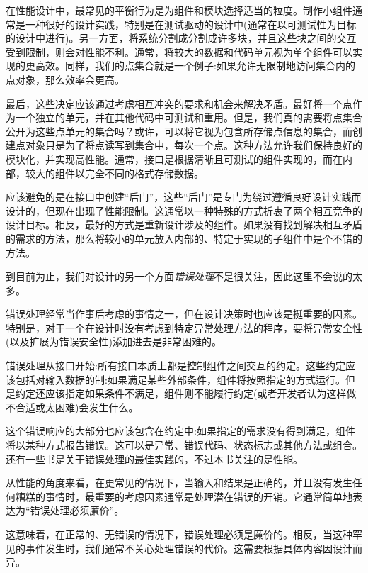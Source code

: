在性能设计中，最常见的平衡行为是为组件和模块选择适当的粒度。制作小组件通常是一种很好的设计实践，特别是在测试驱动的设计中(通常在以可测试性为目标的设计中进行)。另一方面，将系统分割成分割成许多块，并且这些块之间的交互受到限制，则会对性能不利。通常，将较大的数据和代码单元视为单个组件可以实现的更高效。同样，我们的点集合就是一个例子:如果允许无限制地访问集合内的点对象，那么效率会更高。 

最后，这些决定应该通过考虑相互冲突的要求和机会来解决矛盾。最好将一个点作为一个独立的单元，并在其他代码中可测试和重用。但是，我们真的需要将点集合公开为这些点单元的集合吗？或许，可以将它视为包含所存储点信息的集合，而创建点对象只是为了将点读写到集合中，每次一个点。这种方法允许我们保持良好的模块化，并实现高性能。通常，接口是根据清晰且可测试的组件实现的，而在内部，较大的组件以完全不同的格式存储数据。 

应该避免的是在接口中创建“后门”，这些“后门”是专门为绕过遵循良好设计实践而设计的，但现在出现了性能限制。这通常以一种特殊的方式折衷了两个相互竞争的设计目标。相反，最好的方式是重新设计涉及的组件。如果没有找到解决相互矛盾的需求的方法，那么将较小的单元放入内部的、特定于实现的子组件中是个不错的方法。

到目前为止，我们对设计的另一个方面\textit{错误处理}不是很关注，因此这里不会说的太多。


错误处理经常当作事后考虑的事情之一，但在设计决策时也应该是挺重要的因素。特别是，对于一个在设计时没有考虑到特定异常处理方法的程序，要将异常安全性(以及扩展为错误安全性)添加进去是非常困难的。

错误处理从接口开始:所有接口本质上都是控制组件之间交互的约定。这些约定应该包括对输入数据的制:如果满足某些外部条件，组件将按照指定的方式运行。但是约定还应该指定如果条件不满足，组件则不能履行约定(或者开发者认为这样做不合适或太困难)会发生什么。 

这个错误响应的大部分也应该包含在约定中:如果指定的需求没有得到满足，组件将以某种方式报告错误。这可以是异常、错误代码、状态标志或其他方法或组合。还有一些书是关于错误处理的最佳实践的，不过本书关注的是性能。

从性能的角度来看，在更常见的情况下，当输入和结果是正确的，并且没有发生任何糟糕的事情时，最重要的考虑因素通常是处理潜在错误的开销。它通常简单地表达为“错误处理必须廉价”。

这意味着，在正常的、无错误的情况下，错误处理必须是廉价的。相反，当这种罕见的事件发生时，我们通常不关心处理错误的代价。这需要根据具体内容因设计而异。 

